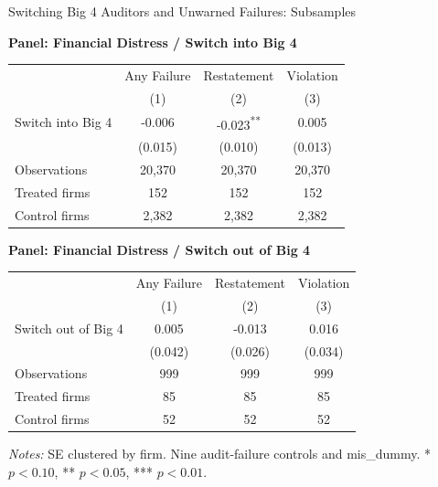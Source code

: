 \documentclass[10pt]{article}
\newcommand{\sym}[1]{\textsuperscript{#1}}
\begin{document}
\fontsize{10}{12}\selectfont
\setlength{\tabcolsep}{3pt}\renewcommand{\arraystretch}{1.15}
\begin{center}\large Switching Big 4 Auditors and Unwarned Failures: Subsamples\end{center}
\medskip\textbf{Panel: Financial Distress / Switch into Big 4}\par\smallskip
\begin{tabular*}{\textwidth}{@{\extracolsep{\fill}}lccc@{}}
\toprule
 & Any Failure & Restatement & Violation \\
 & (1) & (2) & (3) \\
\midrule
Switch into Big 4 & -0.006 & -0.023\sym{**} & 0.005 \\
 & (0.015) & (0.010) & (0.013) \\
Observations & 20,370 & 20,370 & 20,370 \\
Treated firms & 152 & 152 & 152 \\
Control firms & 2,382 & 2,382 & 2,382 \\
\bottomrule\end{tabular*}\par
\medskip\textbf{Panel: Financial Distress / Switch out of Big 4}\par\smallskip
\begin{tabular*}{\textwidth}{@{\extracolsep{\fill}}lccc@{}}
\toprule
 & Any Failure & Restatement & Violation \\
 & (1) & (2) & (3) \\
\midrule
Switch out of Big 4 & 0.005 & -0.013 & 0.016 \\
 & (0.042) & (0.026) & (0.034) \\
Observations & 999 & 999 & 999 \\
Treated firms & 85 & 85 & 85 \\
Control firms & 52 & 52 & 52 \\
\bottomrule\end{tabular*}\par
\medskip\fontsize{9}{11}\selectfont\textit{Notes:} SE clustered by firm. Nine audit-failure controls and mis\_dummy. * $p<0.10$, ** $p<0.05$, *** $p<0.01$.
\end{document}
